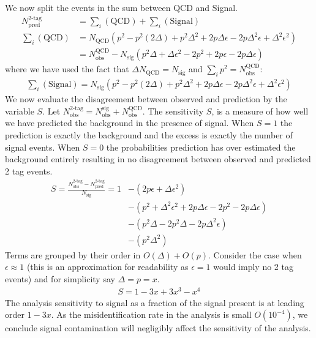 We now split the events in the sum between QCD and Signal. 
\begin{align*}
N_{\textrm{pred}}^{\textrm{2-tag}} &= \sum_i (\textrm{QCD}) + \sum_i (\textrm{Signal})\\
\sum_i (\textrm{QCD}) &= N_{\textrm{QCD}} ( p^2 - p^2(2\Delta) + p^2\Delta^2 + 2p\Delta \epsilon - 2 p \Delta^2 \epsilon + \Delta^2 \epsilon^2)\\
&= N_{\textrm{obs}}^{\textrm{QCD}} - N_{\textrm{sig}}(p^2\Delta + \Delta \epsilon^2 - 2p^2 + 2p\epsilon - 2p\Delta \epsilon) 
\end{align*}
where we have used the fact that $\Delta N_{\textrm{QCD}} = N_{\textrm{sig}}$ and $\sum_i p^2 = N_{\textrm{obs}}^{\textrm{QCD}}$:
\begin{align*}
\sum_i(\textrm{Signal}) =  N_{\textrm{sig}}(  p^2 - p^2(2\Delta) + p^2\Delta^2 + 2p\Delta \epsilon - 2 p \Delta^2 \epsilon + \Delta^2 \epsilon^2)
\end{align*}
We now evaluate the disagreement between observed and prediction by the variable $S$. Let 
$N_{\textrm{obs}}^{\textrm{2-tag}} = N_{\textrm{obs}}^{\textrm{sig}} + N_{\textrm{obs}}^{\textrm{QCD}}$. The sensitivity $S$, is a measure of how well we have predicted the background
in the presence of signal. When $S=1$ the prediction is exactly the background and the excess is exactly the number of signal events. 
When $S=0$ the probabilities prediction has over estimated the background entirely resulting in no disagreement between observed and predicted 
2 tag events.
\begin{align*}
S = \frac{N_{\textrm{obs}}^{\textrm{2-tag}} - N_{\textrm{pred}}^{\textrm{2-tag}} }{N_{\textrm{sig}}} = 1 &- (2p\epsilon + \Delta \epsilon^2) \\
&- (p^2 + \Delta^2\epsilon^2 +  2p\Delta\epsilon -2p^2  - 2p\Delta\epsilon) \\
&- (p^2\Delta -2p^2\Delta -2p\Delta^2\epsilon) \\
&- (p^2\Delta^2)
\end{align*}
Terms are grouped by their order in $O(\Delta)+O(p)$. Consider the case when $\epsilon \approx 1$ (this is an approximation for readability as $\epsilon=1$ would imply no 2 tag events) and for simplicity say $\Delta = p = x$.
\begin{align*}
S= 1 - 3x + 3 x^3 - x^4
\end{align*}
The analysis sensitivity to signal as a fraction of the signal present is 
at leading order $1-3x$. As the misidentification rate in the analysis is small $O(10^{-4})$,  we conclude signal contamination will negligibly affect the sensitivity of the analysis. 

